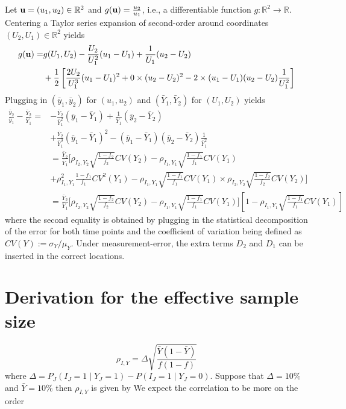 \documentclass[11pt]{amsart}
\begin{document}
Let ${\bf u} = (u_1,u_2) \in \mathbb{R}^2$ and $g({\bf u}) = \frac{u_2}{u_1}$, i.e., a differentiable function $g:\mathbb{R}^2 \to \mathbb{R}$. Centering a Taylor series expansion of second-order around coordinates $(U_2, U_1) \in \mathbb{R}^2$ yields
$$
\begin{aligned}
g({\bf u}) =& g(U_1, U_2) - \frac{U_2}{U_1^2} (u_1 - U_1) + \frac{1}{U_1} (u_2 - U_2) \\
&+ \frac{1}{2} \left[ \frac{2 U_2}{U_1^3} (u_1 - U_1)^2 + 0 \times (u_2 - U_2)^2 - 2 \times (u_1 - U_1) (u_2 - U_2) \frac{1}{U_1^2} \right]
\end{aligned}
$$
Plugging in $(\bar y_1, \bar y_2)$ for $(u_1, u_2)$ and $(\bar Y_1, \bar Y_2)$ for $(U_1, U_2)$ yields
$$
\begin{aligned}
\frac{\bar y_2}{\bar y_1} - \frac{\bar Y_2}{\bar Y_1} =& - \frac{\bar Y_2}{\bar Y_1^2} (\bar y_1 - \bar Y_1) + \frac{1}{\bar Y_1} (\bar y_2 - \bar Y_2) \\
&+ \frac{\bar Y_2}{\bar Y_1^3} (\bar y_1 - \bar Y_1)^2 -  (\bar y_1 - \bar Y_1) (\bar y_2 - \bar Y_2) \frac{1}{\bar Y_1^2} \\
&= \frac{\bar Y_2}{\bar Y_1} \bigg[  \rho_{I_2,Y_2} \sqrt{\frac{1-f_2}{f_2}} CV (Y_2)  -\rho_{I_1,Y_1} \sqrt{\frac{1-f_1}{f_1}} CV (Y_1) \\
&+ \rho^2_{I_1,Y_1} \frac{1-f_1}{f_1} CV^2 (Y_1) -  \rho_{I_1,Y_1} \sqrt{\frac{1-f_1}{f_1}} CV (Y_1) \times \rho_{I_2,Y_2} \sqrt{\frac{1-f_2}{f_2}} CV (Y_2)   \bigg] \\
&= \frac{\bar Y_2}{\bar Y_1} \bigg[ \rho_{I_2,Y_2} \sqrt{\frac{1-f_2}{f_2}} CV (Y_2)  -\rho_{I_1,Y_1} \sqrt{\frac{1-f_1}{f_1}} CV (Y_1) \bigg] \left[ 1 - \rho_{I_1,Y_1} \sqrt{\frac{1-f_1}{f_1}} CV (Y_1) \right]
\end{aligned}
$$
where the second equality is obtained by plugging in the statistical decomposition of the error for both time points and the coefficient of variation being defined as $CV(Y) := \sigma_Y/\mu_Y$.  Under measurement-error, the extra terms $D_{2}$ and $D_1$ can be inserted in the correct locations.

\section{Derivation for the effective sample size}

\begin{equation} \label{eq:binaryrho}
\rho_{I,Y} = \Delta \sqrt{\frac{\bar Y (1 - \bar Y)}{f (1-f)} }
\end{equation}
where $\Delta = P_J (I_J = 1 \mid Y_J = 1) - P(I_J = 1 \mid Y_J = 0)$.  Suppose that $\Delta = 10\%$ and $\bar Y = 10\%$ then $\rho_{I,Y}$ is given by
We expect the correlation to be more on the order
\end{document}
